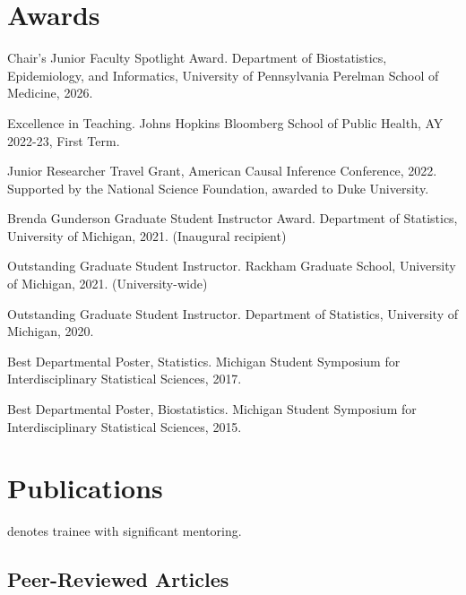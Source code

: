 \documentclass[letterpaper,11pt]{article} %
\begin{document}
	\section*{Awards}
	\begin{etaremune}
		\item Chair's Junior Faculty Spotlight Award. Department of Biostatistics, Epidemiology, and Informatics, University of Pennsylvania Perelman School of Medicine, 2026.
		\item Excellence in Teaching. Johns Hopkins Bloomberg School of Public Health, AY 2022-23, First Term.
		\item Junior Researcher Travel Grant, American Causal Inference Conference, 2022. Supported by the National Science Foundation, awarded to Duke University.
		\item Brenda Gunderson Graduate Student Instructor Award. Department of Statistics, University of Michigan, 2021. (Inaugural recipient)
		\item Outstanding Graduate Student Instructor. Rackham Graduate School, University of Michigan, 2021. (University-wide)
		\item Outstanding Graduate Student Instructor. Department of Statistics, University of Michigan, 2020.
		\item Best Departmental Poster, Statistics. Michigan Student Symposium for Interdisciplinary Statistical Sciences, 2017.
		\item Best Departmental Poster, Biostatistics. Michigan Student Symposium for Interdisciplinary Statistical Sciences, 2015.
	\end{etaremune}
	
	\section*{Publications}
	
	\setlength\bibitemsep{\itemsep}
	
	{\small%
		 denotes trainee with significant mentoring.}
	
	\subsection*{Peer-Reviewed Articles}
    	\begin{refsection}[peerreviewed]
    		\nocite{*}
    		\printbibliography[heading=none,type=article]
    	\end{refsection}	
	
\end{document}
